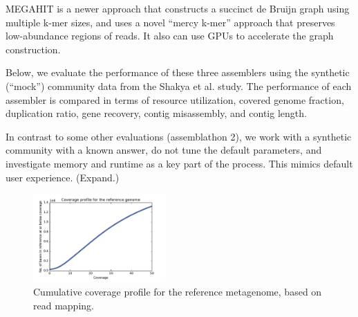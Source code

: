 \documentclass[10pt,a4paper,twocolumn]{article}
\begin{document}
MEGAHIT \cite{megahit} is a newer approach that constructs a succinct
de Bruijn graph using multiple k-mer sizes, and uses a novel ``mercy
k-mer'' approach that preserves low-abundance regions of reads. It also
can use GPUs to accelerate the graph construction.

Below, we evaluate the performance of these three assemblers using the
synthetic (``mock'') community data from the Shakya et al. study.
The performance of each assembler is compared in terms
of resource utilization, covered genome fraction, duplication ratio, gene
recovery, contig misassembly, and contig length.

In contrast to some other evaluations (assemblathon 2), we work with a
synthetic community with a known answer, do not tune the default
parameters, and investigate memory and runtime as a key part of the
process.  This mimics default user experience. (Expand.)





 

 
\begin{figure}[!h]
\centering
\includegraphics[width=0.45\textwidth]{CoverageProfile.pdf}  
\caption{\label{fig:coverage-profile} Cumulative coverage profile for the reference metagenome, based on read mapping. }
\end{figure}
\end{document}
